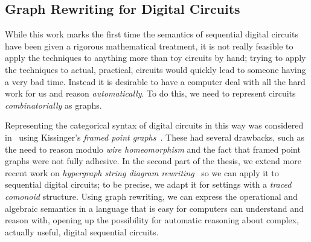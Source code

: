 \subsection{Graph Rewriting for Digital Circuits}

While this work marks the first time the semantics of sequential digital
circuits have been given a rigorous mathematical treatment, it is not really
feasible to apply the techniques to anything more than toy circuits by hand;
trying to apply the techniques to actual, practical, circuits would quickly lead
to someone having a very bad time.
Instead it is desirable to have a computer deal with all the hard work
for us and reason \emph{automatically}.
To do this, we need to represent circuits \emph{combinatorially} as graphs.

Representing the categorical syntax of digital circuits in this way was
considered in~\cite{ghica2017diagrammatic} using
Kissinger's \emph{framed point graphs}~\cite{kissinger2012pictures}.
These had several drawbacks, such as the need to reason modulo
\emph{wire homeomorphism} and the fact that framed point graphs were not fully
adhesive.
In the second part of the thesis, we extend more recent work on
\emph{hypergraph string diagram rewriting}~\cite{bonchi2022string,bonchi2022stringa,bonchi2022stringb}
so we can apply it to sequential digital circuits; to be precise, we adapt it
for settings with a \emph{traced comonoid} structure.
Using graph rewriting, we can express the operational and algebraic semantics
in a language that is easy for computers can understand and reason with, opening
up the possibility for automatic reasoning about complex, actually useful,
digital sequential circuits.
